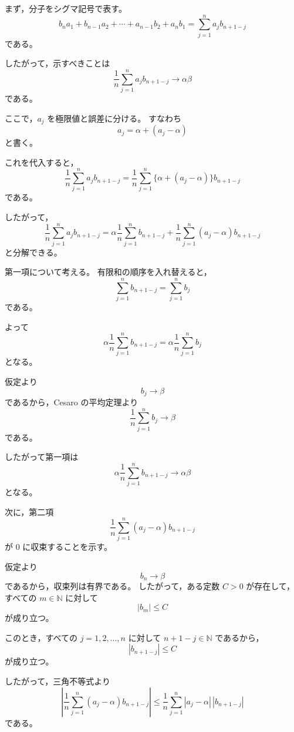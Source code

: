 \begin{strategy}
    まず，分子をシグマ記号で表す。
    \[
        b_n a_1+b_{n-1}a_2+\cdots+a_{n-1}b_2+a_n b_1
        =
        \sum_{j=1}^{n}a_jb_{n+1-j}
    \]
    である。

    したがって，示すべきことは
    \[
        \frac{1}{n}\sum_{j=1}^{n}a_jb_{n+1-j}
        \to
        \alpha\beta
    \]
    である。

    ここで，$a_j$ を極限値と誤差に分ける。
    すなわち
    \[
        a_j=\alpha+(a_j-\alpha)
    \]
    と書く。

    これを代入すると，
    \[
        \frac{1}{n}\sum_{j=1}^{n}a_jb_{n+1-j}
        =
        \frac{1}{n}\sum_{j=1}^{n}
        \{\alpha+(a_j-\alpha)\}b_{n+1-j}
    \]
    である。

    したがって，
    \[
        \frac{1}{n}\sum_{j=1}^{n}a_jb_{n+1-j}
        =
        \alpha
        \frac{1}{n}\sum_{j=1}^{n}b_{n+1-j}
        +
        \frac{1}{n}\sum_{j=1}^{n}(a_j-\alpha)b_{n+1-j}
    \]
    と分解できる。

    第一項について考える。
    有限和の順序を入れ替えると，
    \[
        \sum_{j=1}^{n}b_{n+1-j}
        =
        \sum_{j=1}^{n}b_j
    \]
    である。

    よって
    \[
        \alpha
        \frac{1}{n}\sum_{j=1}^{n}b_{n+1-j}
        =
        \alpha
        \frac{1}{n}\sum_{j=1}^{n}b_j
    \]
    となる。

    仮定より
    \[
        b_j\to\beta
    \]
    であるから，Cesaro の平均定理より
    \[
        \frac{1}{n}\sum_{j=1}^{n}b_j
        \to
        \beta
    \]
    である。

    したがって第一項は
    \[
        \alpha
        \frac{1}{n}\sum_{j=1}^{n}b_{n+1-j}
        \to
        \alpha\beta
    \]
    となる。

    次に，第二項
    \[
        \frac{1}{n}\sum_{j=1}^{n}(a_j-\alpha)b_{n+1-j}
    \]
    が $0$ に収束することを示す。

    仮定より
    \[
        b_n\to\beta
    \]
    であるから，収束列は有界である。
    したがって，ある定数 $C>0$ が存在して，
    すべての $m\in\mathbb{N}$ に対して
    \[
        |b_m|\leq C
    \]
    が成り立つ。

    このとき，すべての $j=1,2,\ldots,n$ に対して
    $n+1-j\in\mathbb{N}$ であるから，
    \[
        |b_{n+1-j}|\leq C
    \]
    が成り立つ。

    したがって，三角不等式より
    \[
        \left|
            \frac{1}{n}\sum_{j=1}^{n}(a_j-\alpha)b_{n+1-j}
        \right|
        \leq
        \frac{1}{n}\sum_{j=1}^{n}
        |a_j-\alpha|\,|b_{n+1-j}|
    \]
    である。


\end{strategy}
